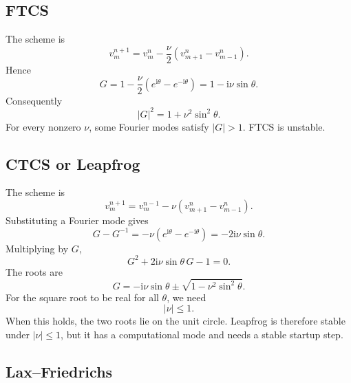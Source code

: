 \documentclass[11pt]{article}
\newcommand{\ii}{\mathrm{i}}
\begin{document}
\subsection{FTCS}

The scheme is
\begin{equation}
    v_m^{n+1}=v_m^n-\frac{\nu}{2}(v_{m+1}^n-v_{m-1}^n).
\end{equation}
Hence
\begin{equation}
    G=1-\frac{\nu}{2}(e^{\ii\theta}-e^{-\ii\theta})
    =
    1-\ii\nu\sin\theta.
\end{equation}
Consequently
\begin{equation}
    |G|^2=1+\nu^2\sin^2\theta.
\end{equation}
For every nonzero $\nu$, some Fourier modes satisfy $|G|>1$.  FTCS is unstable.

\subsection{CTCS or Leapfrog}

The scheme is
\begin{equation}
    v_m^{n+1}=v_m^{n-1}-\nu(v_{m+1}^n-v_{m-1}^n).
\end{equation}
Substituting a Fourier mode gives
\begin{equation}
    G-G^{-1}=-\nu(e^{\ii\theta}-e^{-\ii\theta})
    =
    -2\ii\nu\sin\theta.
\end{equation}
Multiplying by $G$,
\begin{equation}
    G^2+2\ii\nu\sin\theta\,G-1=0.
\end{equation}
The roots are
\begin{equation}
    G=-\ii\nu\sin\theta
    \pm \sqrt{1-\nu^2\sin^2\theta}.
\end{equation}
For the square root to be real for all $\theta$, we need
\begin{equation}
    |\nu|\le1.
\end{equation}
When this holds, the two roots lie on the unit circle.  Leapfrog is therefore stable under $|\nu|\le1$, but it has a computational mode and needs a stable startup step.

\subsection{Lax--Friedrichs}
\end{document}

